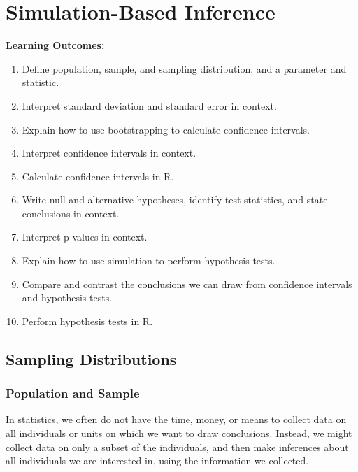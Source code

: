 \documentclass[
  letterpaper,
  DIV=11,
  numbers=noendperiod]{scrreprt}
\providecommand{\tightlist}{%
  \setlength{\itemsep}{0pt}\setlength{\parskip}{0pt}}\usepackage{longtable,booktabs,array}
\begin{document}

\chapter{Simulation-Based Inference}\label{simulation-based-inference}

\textbf{Learning Outcomes:}

\begin{enumerate}
\def\labelenumi{\arabic{enumi}.}
\setcounter{enumi}{13}
\tightlist
\item
  Define population, sample, and sampling distribution, and a parameter
  and statistic.\\
\item
  Interpret standard deviation and standard error in context.\\
\item
  Explain how to use bootstrapping to calculate confidence intervals.\\
\item
  Interpret confidence intervals in context.\\
\item
  Calculate confidence intervals in R.
\item
  Write null and alternative hypotheses, identify test statistics, and
  state conclusions in context.\\
\item
  Interpret p-values in context.\\
\item
  Explain how to use simulation to perform hypothesis tests.
\item
  Compare and contrast the conclusions we can draw from confidence
  intervals and hypothesis tests.\\
\item
  Perform hypothesis tests in R.
\end{enumerate}

\section{Sampling Distributions}\label{sampling-distributions}

\subsection{Population and Sample}\label{population-and-sample}

In statistics, we often do not have the time, money, or means to collect
data on all individuals or units on which we want to draw conclusions.
Instead, we might collect data on only a subset of the individuals, and
then make inferences about all individuals we are interested in, using
the information we collected.
\end{document}

